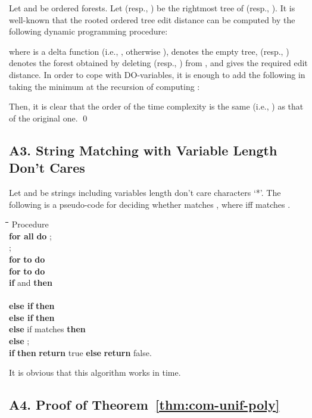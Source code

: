 \documentclass[a4paper]{llncs}
\begin{document}
Let  and  be ordered forests.
Let  (resp., ) be the rightmost tree
of  (resp., ).
It is well-known \cite{bille05} that
the rooted ordered tree edit distance can be
computed by the following dynamic programming procedure:

where  is a delta function
(i.e., , otherwise ),
 denotes the empty tree,
 (resp., ) denotes the forest obtained by deleting  (resp., )
from , and  gives the required edit distance.
In order to cope with DO-variables,
it is enough to add the following in taking the minimum at the recursion
of computing :

Then, it is clear that
the order of the time complexity is the same (i.e., )
as that of the original one.
\qed

\subsection*{A3. String Matching with Variable Length Don't Cares}

Let  and  be strings including
variables length don't care characters `*'.
The following is a pseudo-code for deciding whether  matches ,
where  iff  matches .

\begin{rm}
\begin{tabbing}
\quad \= \quad \= \quad \= \quad \= \quad \= \quad \= \quad \= \kill
\> Procedure \\
\> \> {\bf for all}  {\bf do} 
;\\
\> \> ;\\
\> \> {\bf for}  {\bf to}  {\bf do}\\
\> \> \> {\bf for}  {\bf to}  {\bf do}\\
\> \> \> \> {\bf if}  and  {\bf then}\\
\> \> \> \> \>  \\
\> \> \> \> {\bf else if}  {\bf then}
\\
\> \> \> \> {\bf else if}  {\bf then}
\\
\> \> \> \> {\bf else} if  matches  {\bf then}
\\
\> \> \> \> {\bf else} 
;\\
\> \> {\bf if}  {\bf then} {\bf return} true {\bf else} {\bf return} false.
\end{tabbing}
\end{rm}

It is obvious that this algorithm works in  time.

\subsection*{A4. Proof of Theorem~\ref{thm:com-unif-poly}}
\end{document}
